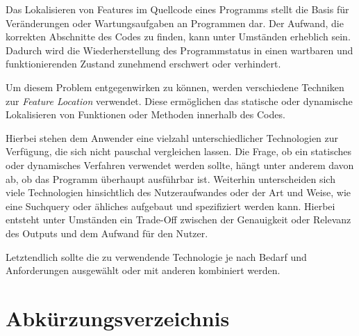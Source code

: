 \documentclass[runningheads,a4paper]{llncs}
\begin{document}
Das Lokalisieren von Features im Quellcode eines Programms stellt die Basis für Veränderungen oder Wartungsaufgaben an Programmen dar. Der Aufwand, die korrekten Abschnitte des Codes zu finden, kann unter Umständen erheblich sein. Dadurch wird die Wiederherstellung des Programmstatus in einen wartbaren und funktionierenden Zustand zunehmend erschwert oder verhindert.

Um diesem Problem entgegenwirken zu können, werden verschiedene Techniken zur \textit{Feature Location} verwendet. Diese ermöglichen das statische oder dynamische Lokalisieren von Funktionen oder Methoden innerhalb des Codes.

Hierbei stehen dem Anwender eine vielzahl unterschiedlicher Technologien zur Verfügung, die sich nicht pauschal vergleichen lassen. Die Frage, ob ein statisches oder dynamisches Verfahren verwendet werden sollte, hängt unter anderem davon ab, ob das Programm überhaupt ausführbar ist. Weiterhin unterscheiden sich viele Technologien hinsichtlich des Nutzeraufwandes oder der Art und Weise, wie eine Suchquery oder ähliches aufgebaut und spezifiziert werden kann. Hierbei entsteht unter Umständen ein Trade-Off zwischen der Genauigkeit oder Relevanz des Outputs und dem Aufwand für den Nutzer.

Letztendlich sollte die zu verwendende Technologie je nach Bedarf und Anforderungen ausgewählt oder mit anderen kombiniert werden.






\clearpage
\listoftables


\section*{Abkürzungsverzeichnis}
\begin{acronym}[FPGA]
\end{acronym}


\clearpage

{}


\end{document}
